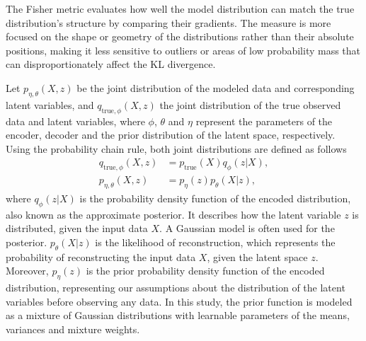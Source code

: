 \documentclass[journal]{IEEEtran}
\begin{document}
The Fisher metric evaluates how well the model distribution can match the true distribution's structure by comparing their gradients. The measure is more focused on the shape or geometry of the distributions rather than their absolute positions, making it less sensitive to outliers or areas of low probability mass that can disproportionately affect the KL divergence.

Let \(p_{\eta, \theta}(X, z)\) be the joint distribution of the modeled data and corresponding latent variables, and \(q_{\text{true},{\phi}}(X, z)\) the joint distribution of the true observed data and latent variables, where \(\phi\), \(\theta\) and \(\eta\) represent the parameters of the encoder, decoder and the prior distribution of the latent space, respectively. Using the probability chain rule, both joint distributions are defined as follows \cite{FAE}
\begin{align}
q_{\text{true},\phi}(X, z) &= p_{\text{true}}(X)q_{\phi}(z|X) \nonumber, \\
p_{\eta,\theta}(X, z) &= p_{\eta}(z)p_{\theta}(X|z),\label{eq:jointDistributions}
\end{align}
where $q_\phi(z|X)$ is the probability density function of the encoded distribution, also known as the approximate posterior. It describes how the latent variable $z$ is distributed, given the input data $X$. A Gaussian model is often used for the posterior. $p_\theta(X|z)$ is the likelihood of reconstruction, which represents the probability of reconstructing the input data $X$, given the latent space $z$. Moreover, $ p_\eta(z)$ is the prior probability density function of the encoded distribution, representing our assumptions about the distribution of the latent variables before observing any data. In this study,  the prior function is modeled as a mixture of Gaussian distributions with learnable parameters of the means, variances and mixture weights. 
\end{document}
